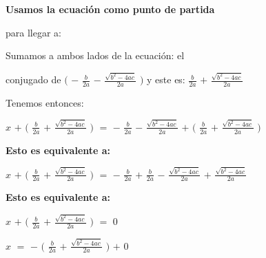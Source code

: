 \documentclass[12pt]{article}
\newenvironment{MyColorPar}[1]{%
    \leavevmode\color{#1}\ignorespaces%
}{%
}%
\begin{document}
\begin{MyColorPar}{Tarawera}
\bfseries Usamos la ecuación {} como punto de partida \vspace{0.5cm}

para llegar a: {} \vspace{0.5cm}

Sumamos a ambos lados de la ecuación: {} el \vspace{0.5cm} 

conjugado de $\bigg($ {\LARGE{$-$ $\frac{b}{2a}$ $-$ $\frac{\sqrt{b^{2}-4ac}}{2a}$}} $\bigg)$ y este es: {\LARGE{$\frac{b}{2a}$ $+$ $\frac{\sqrt{b^{2}-4ac}}{2a}$}}

Tenemos entonces:
\end{MyColorPar} \vspace{0.5cm}

$x$ $+$ $\bigg($ {\LARGE{$\frac{b}{2a}$ $+$ $\frac{\sqrt{b^{2}-4ac}}{2a}$}} $\bigg)$ $=$ {\LARGE{$-$ $\frac{b}{2a}$ $-$ $\frac{\sqrt{b^{2}-4ac}}{2a}$}} $+$ $\bigg($ {\LARGE{$\frac{b}{2a}$ $+$ $\frac{\sqrt{b^{2}-4ac}}{2a}$}} $\bigg)$ \vspace{0.5cm}

\begin{MyColorPar}{Tarawera}
\bfseries Esto es equivalente a:
\end{MyColorPar} \vspace{0.5cm}

$x$ $+$ $\bigg($ {\LARGE{$\frac{b}{2a}$ $+$ $\frac{\sqrt{b^{2}-4ac}}{2a}$}} $\bigg)$ $=$ {\LARGE{$-$ $\frac{b}{2a}$ $+$ {\LARGE{$\frac{b}{2a}$}} $-$ $\frac{\sqrt{b^{2}-4ac}}{2a}$}} $+$ {\LARGE{ $\frac{\sqrt{b^{2}-4ac}}{2a}$}} 

\newpage

\begin{MyColorPar}{Tarawera}
\bfseries Esto es equivalente a:
\end{MyColorPar} \vspace{0.5cm}

$x$ $+$ $\bigg($ {\LARGE{$\frac{b}{2a}$ $+$ $\frac{\sqrt{b^{2}-4ac}}{2a}$}} $\bigg)$ $=$ $0$ \vspace{0.5cm}

$x$  $=$ {\LARGE{$-$}} $\bigg($ {\LARGE{$\frac{b}{2a}$ $+$ $\frac{\sqrt{b^{2}-4ac}}{2a}$}} $\bigg)$ $+$ $0$ \vspace{0.5cm}
\end{document}
